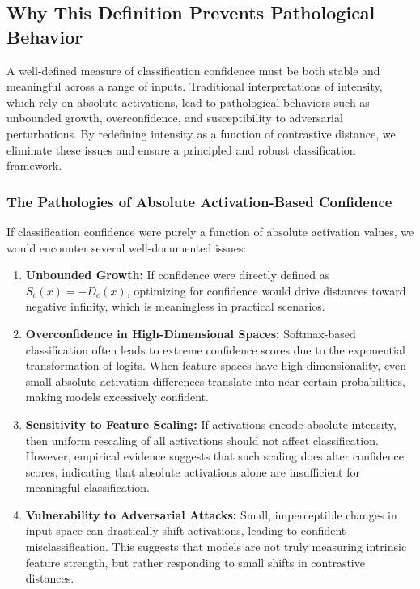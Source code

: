 \subsection{Why This Definition Prevents Pathological Behavior}

A well-defined measure of classification confidence must be both stable and meaningful across a range of inputs. Traditional interpretations of intensity, which rely on absolute activations, lead to pathological behaviors such as unbounded growth, overconfidence, and susceptibility to adversarial perturbations. By redefining intensity as a function of contrastive distance, we eliminate these issues and ensure a principled and robust classification framework.

\subsubsection{The Pathologies of Absolute Activation-Based Confidence}

If classification confidence were purely a function of absolute activation values, we would encounter several well-documented issues:

\begin{enumerate}
    \item \textbf{Unbounded Growth:} If confidence were directly defined as \( S_c(x) = -D_c(x) \), optimizing for confidence would drive distances toward negative infinity, which is meaningless in practical scenarios.
    \item \textbf{Overconfidence in High-Dimensional Spaces:} Softmax-based classification often leads to extreme confidence scores due to the exponential transformation of logits. When feature spaces have high dimensionality, even small absolute activation differences translate into near-certain probabilities, making models excessively confident.
    \item \textbf{Sensitivity to Feature Scaling:} If activations encode absolute intensity, then uniform rescaling of all activations should not affect classification. However, empirical evidence suggests that such scaling does alter confidence scores, indicating that absolute activations alone are insufficient for meaningful classification.
    \item \textbf{Vulnerability to Adversarial Attacks:} Small, imperceptible changes in input space can drastically shift activations, leading to confident misclassification. This suggests that models are not truly measuring intrinsic feature strength, but rather responding to small shifts in contrastive distances.
\end{enumerate}

